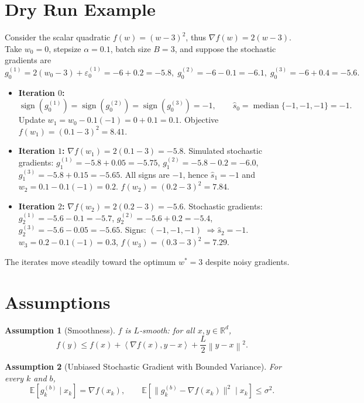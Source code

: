 \documentclass{article}
\newtheorem{assumption}{Assumption}
\newcommand{\sign}{\operatorname{sign}}
\newcommand{\EE}{\mathbb{E}}
\newcommand{\RR}{\mathbb{R}}
\newcommand{\norm}[1]{\left\|#1\right\|}
\newcommand{\inner}[2]{\left\langle #1,#2\right\rangle}
\newcommand{\grad}{\nabla}
\begin{document}
\section*{Dry Run Example}

Consider the scalar quadratic $f(w)=(w-3)^{2}$, thus $\grad f(w)=2(w-3)$.  
Take $w_{0}=0$, stepsize $\alpha=0.1$, batch size $B=3$, and suppose the stochastic gradients are
\[
g_{0}^{(1)}=2(w_{0}-3)+\varepsilon_{0}^{(1)}=-6+0.2=-5.8,\;
g_{0}^{(2)}=-6-0.1=-6.1,\;
g_{0}^{(3)}=-6+0.4=-5.6 .
\]
\begin{itemize}
\item \textbf{Iteration $0$:}  
  \[
  \sign(g_{0}^{(1)})=\sign(g_{0}^{(2)})=\sign(g_{0}^{(3)})=-1,
  \qquad\hat{s}_{0}=\operatorname{median}\{-1,-1,-1\}=-1 .
  \]
  Update $w_{1}=w_{0}-0.1(-1)=0+0.1=0.1$.  
  Objective $f(w_{1})=(0.1-3)^{2}=8.41$.
\item \textbf{Iteration $1$:}  
  $\grad f(w_{1})=2(0.1-3)=-5.8$.  
  Simulated stochastic gradients:
  $g_{1}^{(1)}=-5.8+0.05=-5.75$, $g_{1}^{(2)}=-5.8-0.2=-6.0$, $g_{1}^{(3)}=-5.8+0.15=-5.65$.  
  All signs are $-1$, hence $\hat{s}_{1}=-1$ and $w_{2}=0.1-0.1(-1)=0.2$.  
  $f(w_{2})=(0.2-3)^{2}=7.84$.
\item \textbf{Iteration $2$:}  
  $\grad f(w_{2})=2(0.2-3)=-5.6$.  
  Stochastic gradients: $g_{2}^{(1)}=-5.6-0.1=-5.7$, $g_{2}^{(2)}=-5.6+0.2=-5.4$, $g_{2}^{(3)}=-5.6-0.05=-5.65$.  
  Signs: $(-1,-1,-1)$ $\Rightarrow\hat{s}_{2}=-1$.  
  $w_{3}=0.2-0.1(-1)=0.3$, $f(w_{3})=(0.3-3)^{2}=7.29$.
\end{itemize}
The iterates move steadily toward the optimum $w^{*}=3$ despite noisy gradients.

\section*{Assumptions}

\begin{assumption}[Smoothness]\label{as:smooth}
$f$ is $L$‑smooth: for all $x,y\in\RR^{d}$,
\[
f(y)\le f(x)+\inner{\grad f(x)}{y-x}+\frac{L}{2}\norm{y-x}^{2}.
\]
\end{assumption}

\begin{assumption}[Unbiased Stochastic Gradient with Bounded Variance]\label{as:unbiased}
For every $k$ and $b$,
\[
\EE\!\left[g_{k}^{(b)}\mid x_{k}\right]=\grad f(x_{k}),\qquad
\EE\!\left[\|g_{k}^{(b)}-\grad f(x_{k})\|^{2}\mid x_{k}\right]\le\sigma^{2}.
\]
\end{assumption}
\end{document}
